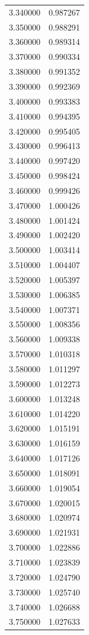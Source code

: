 \begin{tabular}{rr}
3.340000 & 0.987267 \\
3.350000 & 0.988291 \\
3.360000 & 0.989314 \\
3.370000 & 0.990334 \\
3.380000 & 0.991352 \\
3.390000 & 0.992369 \\
3.400000 & 0.993383 \\
3.410000 & 0.994395 \\
3.420000 & 0.995405 \\
3.430000 & 0.996413 \\
3.440000 & 0.997420 \\
3.450000 & 0.998424 \\
3.460000 & 0.999426 \\
3.470000 & 1.000426 \\
3.480000 & 1.001424 \\
3.490000 & 1.002420 \\
3.500000 & 1.003414 \\
3.510000 & 1.004407 \\
3.520000 & 1.005397 \\
3.530000 & 1.006385 \\
3.540000 & 1.007371 \\
3.550000 & 1.008356 \\
3.560000 & 1.009338 \\
3.570000 & 1.010318 \\
3.580000 & 1.011297 \\
3.590000 & 1.012273 \\
3.600000 & 1.013248 \\
3.610000 & 1.014220 \\
3.620000 & 1.015191 \\
3.630000 & 1.016159 \\
3.640000 & 1.017126 \\
3.650000 & 1.018091 \\
3.660000 & 1.019054 \\
3.670000 & 1.020015 \\
3.680000 & 1.020974 \\
3.690000 & 1.021931 \\
3.700000 & 1.022886 \\
3.710000 & 1.023839 \\
3.720000 & 1.024790 \\
3.730000 & 1.025740 \\
3.740000 & 1.026688 \\
3.750000 & 1.027633 \\

\end{tabular}
